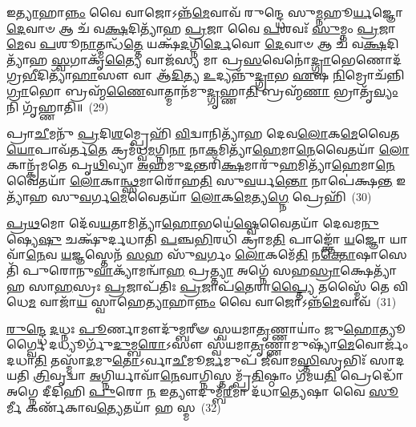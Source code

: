 𑌇\-\ul{𑌤𑍍𑌯𑌾}\-𑌹𑌾\-\ul{𑌨𑍍𑌨𑌂} 𑌵𑍈 𑌵𑌾𑌜𑍋\-𑌽𑌨𑍍𑌨᳴\-\ul{𑌮𑍇}\-𑌵𑌾𑌵᳴ 𑌰𑍁𑌨𑍍𑌦𑍍𑌧𑍇 𑌸𑍁\-\ul{𑌮𑍍𑌨}\-𑌹𑍂\-\ul{𑌰𑍍𑌯}\-𑌜𑍍𑌞𑍋 \ul{𑌦𑍇}\-𑌵𑌾𑍞 𑌆 𑌚᳴ 𑌵\-\ul{𑌕𑍍𑌷}\-𑌦𑌿𑌤𑍍𑌯𑌾᳴𑌹 \ul{𑌪𑍍𑌰}\-𑌜𑌾 𑌵𑍈 \ul{𑌪}\-𑌶𑌵𑌃᳴ \ul{𑌸𑍁}\-𑌮𑍍𑌨𑌂 \ul{𑌪𑍍𑌰}\-𑌜𑌾\-\ul{𑌮𑍇}\-𑌵 \ul{𑌪}\-𑌶𑍂\-\ul{𑌨𑌾}\-𑌤𑍍𑌮𑌨𑍍𑌧᳴\-\ul{𑌤𑍍𑌤𑍇} 𑌯𑌕𑍍𑌷᳴\-\ul{𑌦}\-𑌗𑍍𑌨𑌿\-\ul{𑌰𑍍𑌦𑍇}\-𑌵𑍋 \ul{𑌦𑍇}\-𑌵𑌾𑍞 𑌆 𑌚᳴ 𑌵\-\ul{𑌕𑍍𑌷}\-𑌦𑌿𑌤𑍍𑌯𑌾᳴𑌹 \ul{𑌸𑍍𑌵}\-𑌗𑌾𑌕𑍃᳴\-\ul{𑌤𑍍𑌯𑍈} 𑌵𑌾𑌜᳴𑌸𑍍𑌯 𑌮𑌾 𑌪𑍍𑌰\-\ul{𑌸}\-𑌵𑍇𑌨𑍋॑\-\ul{𑌦𑍍𑌗𑍍𑌰𑌾}\-𑌭𑍇𑌣𑍋𑌦᳴𑌗𑍍𑌰\-\ul{𑌭𑍀}\-𑌦𑌿𑌤𑍍𑌯𑌾᳴\-\ul{𑌹𑌾}\-𑌸𑍗 𑌵𑌾 𑌆᳴\-\ul{𑌦𑌿}\-𑌤𑍍𑌯 \ul{𑌉}\-𑌦𑍍𑌯𑌨𑍍𑌨𑍁᳴\-\ul{𑌦𑍍𑌗𑍍𑌰𑌾}\-𑌭 \ul{𑌏}\-𑌷 \ul{𑌨𑌿}\-𑌮𑍍𑌰𑍋𑌚᳴𑌨𑍍𑌨𑌿\-\ul{𑌗𑍍𑌰𑌾}\-𑌭𑍋 𑌬𑍍𑌰𑌹𑍍𑌮᳴\-\ul{𑌣𑍈}\-𑌵𑌾𑌤𑍍𑌮𑌾𑌨᳴𑌮𑍁\-\ul{𑌦𑍍𑌗𑍃}\-𑌹𑍍𑌣𑌾\-\ul{𑌤𑌿} 𑌬𑍍𑌰𑌹𑍍𑌮᳴\-\ul{𑌣𑌾} 𑌭𑍍𑌰𑌾𑌤𑍃᳴\-\ul{𑌵𑍍𑌯𑌂} 𑌨𑌿 𑌗𑍃᳴𑌹𑍍𑌣𑌾𑌤𑌿॥~(29)

{\anuvakamend[{\-\ul{𑌪𑍍𑌰𑌾}\-𑌣𑍈𑌃 𑌪𑍋𑌷𑍋॑\-𑌽\-\ul{𑌪𑍍𑌰}\-𑌤𑍍𑌯𑌾𑌗𑍍𑌨𑍀॑\-\ul{𑌧𑍍𑌰𑍇} 𑌪𑌤𑌿᳴\-\ul{𑌮𑍇}\-𑌷 𑌦𑌶᳴ 𑌚}]}%

𑌪𑍍𑌰𑌾\-\ul{𑌚𑍀}\-𑌮𑌨𑍁᳴ \ul{𑌪𑍍𑌰}\-𑌦𑌿\-\ul{𑌶}\-𑌮𑍍𑌪𑍍𑌰𑍇𑌹𑌿᳴ \ul{𑌵𑌿}\-𑌦𑍍𑌵𑌾𑌨𑌿𑌤𑍍𑌯𑌾᳴𑌹 𑌦𑍇𑌵\-\ul{𑌲𑍋}\-𑌕\-\ul{𑌮𑍇}\-𑌵𑍈𑌤\-\ul{𑌯𑍋}\-𑌪𑌾𑌵᳴𑌰𑍍𑌤\-\ul{𑌤𑍇} 𑌕𑍍𑌰𑌮᳴𑌧𑍍𑌵\-\ul{𑌮}\-𑌗𑍍𑌨𑌿\-\ul{𑌨𑌾} 𑌨𑌾\-\ul{𑌕}\-𑌮𑌿𑌤𑍍𑌯𑌾᳴\-\ul{𑌹𑍇}\-𑌮𑌾\-\ul{𑌨𑍇}\-𑌵𑍈𑌤𑌯𑌾᳴ \ul{𑌲𑍋}\-𑌕𑌾𑌨𑍍𑌕𑍍𑌰᳴𑌮𑌤𑍇 𑌪𑍃\-\ul{𑌥𑌿}\-𑌵𑍍𑌯𑌾 \ul{𑌅}\-𑌹𑌮𑍁\-\ul{𑌦}\-𑌨𑍍𑌤𑌰𑌿᳴\-\ul{𑌕𑍍𑌷}\-𑌮𑌾𑌰𑍁᳴\-\ul{𑌹}\-𑌮𑌿𑌤𑍍𑌯𑌾᳴\-\ul{𑌹𑍇}\-𑌮𑌾\-\ul{𑌨𑍇}\-𑌵𑍈𑌤𑌯𑌾᳴ \ul{𑌲𑍋}\-𑌕𑌾\-\ul{𑌨𑍍𑌥𑍍𑌸}\-𑌮𑌾𑌰𑍋᳴𑌹\-\ul{𑌤𑌿} 𑌸𑍁\-\ul{𑌵}\-𑌰𑍍𑌯\-\ul{𑌨𑍍𑌤𑍋} 𑌨𑌾𑌪𑍇॑𑌕𑍍𑌷\-\ul{𑌨𑍍𑌤} 𑌇𑌤𑍍𑌯𑌾᳴𑌹 𑌸𑍁\-\ul{𑌵}\-𑌰𑍍𑌗\-\ul{𑌮𑍇}\-𑌵𑍈𑌤𑌯𑌾᳴ \ul{𑌲𑍋}\-𑌕\-\ul{𑌮𑍇}\-𑌤𑍍𑌯\-\ul{𑌗𑍍𑌨𑍇} 𑌪𑍍𑌰𑍇𑌹𑌿᳴~(30)

\-\ul{𑌪𑍍𑌰}\-\-\ul{𑌥}\-𑌮𑍋 𑌦𑍇᳴𑌵\-\ul{𑌯}\-𑌤𑌾𑌮𑌿𑌤𑍍𑌯𑌾᳴\-\ul{𑌹𑍋}\-𑌭𑌯𑍇॑\-\ul{𑌷𑍍𑌵𑍇}\-𑌵𑍈𑌤𑌯𑌾᳴ 𑌦𑍇𑌵𑌮\-\ul{𑌨𑍁}\-𑌷𑍍𑌯𑍇\-\ul{𑌷𑍁} 𑌚𑌕𑍍𑌷𑍁᳴𑌰𑍍𑌦𑌧𑌾𑌤𑌿 \ul{𑌪}\-𑌞𑍍𑌚\-\ul{𑌭𑌿}\-𑌰𑌧𑌿᳴ 𑌕𑍍𑌰𑌾𑌮\-\ul{𑌤𑌿} 𑌪𑌾𑌙𑍍𑌕𑍍𑌤𑍋᳴ \ul{𑌯}\-𑌜𑍍𑌞𑍋 𑌯𑌾𑌵𑌾᳴\-\ul{𑌨𑍇}\-𑌵 \ul{𑌯}\-𑌜𑍍𑌞𑌸𑍍𑌤𑍇𑌨᳴ \ul{𑌸}\-𑌹 𑌸𑍁᳴\-\ul{𑌵}\-𑌰𑍍𑌗𑌂 \ul{𑌲𑍋}\-𑌕𑌮𑍇᳴\-\ul{𑌤𑌿} 𑌨\-\ul{𑌕𑍍𑌤𑍋}\-𑌷𑌾𑌸𑍇𑌤𑌿᳴ 𑌪𑍁𑌰𑍋𑌨𑍁\-\ul{𑌵𑌾}\-𑌕𑍍𑌯𑌾᳴𑌮𑌨𑍍𑌵𑌾᳴\-\ul{𑌹} 𑌪𑍍𑌰\-\ul{𑌤𑍍𑌤𑍍𑌯𑌾} 𑌅𑌗𑍍𑌨𑍇᳴ 𑌸𑌹\-\ul{𑌸𑍍𑌰𑌾}\-𑌕𑍍𑌷𑍇𑌤𑍍𑌯𑌾᳴𑌹 𑌸𑌾\-\ul{𑌹}\-𑌸𑍍𑌰𑌃 \ul{𑌪𑍍𑌰}\-𑌜𑌾𑌪᳴𑌤𑌿𑌃 \ul{𑌪𑍍𑌰}\-𑌜𑌾𑌪᳴\-\ul{𑌤𑍇}\-𑌰𑌾\-\ul{𑌪𑍍𑌤𑍍𑌯𑍈} 𑌤𑌸𑍍𑌮𑍈᳴ 𑌤𑍇 𑌵𑌿𑌧𑍇\-\ul{𑌮} 𑌵𑌾𑌜𑌾᳴\-\ul{𑌯} 𑌸𑍍𑌵𑌾𑌹𑍇\-\ul{𑌤𑍍𑌯𑌾}\-𑌹𑌾\-\ul{𑌨𑍍𑌨𑌂} 𑌵𑍈 𑌵𑌾𑌜𑍋\-𑌽𑌨𑍍𑌨᳴\-\ul{𑌮𑍇}\-𑌵𑌾𑌵᳴~(31)

\-\ul{𑌰𑍁}\-\-\ul{𑌨𑍍𑌦𑍍𑌧𑍇} \ul{𑌦}\-𑌧𑍍𑌨𑌃 \ul{𑌪𑍂}\-𑌰𑍍𑌣𑌾𑌮𑍗𑌦𑍁᳴𑌮𑍍𑌬𑌰𑍀𑍟 𑌸𑍍𑌵𑌯𑌮𑌾\-\ul{𑌤𑍃}\-𑌣𑍍𑌣𑌾𑌯𑌾𑌂॑ 𑌜𑍁\-\ul{𑌹𑍋}\-𑌤𑍍𑌯𑍂𑌰𑍍𑌗𑍍𑌵𑍈 𑌦𑌧𑍍𑌯𑍂𑌰𑍍𑌗𑍁᳴\-\ul{𑌦𑍁}\-𑌮𑍍𑌬\-\ul{𑌰𑍋}\-\-𑌽𑌸𑍗 𑌸𑍍𑌵᳴𑌯𑌮𑌾\-\ul{𑌤𑍃}\-𑌣𑍍𑌣𑌾𑌮𑍁𑌷𑍍𑌯𑌾᳴\-\ul{𑌮𑍇}\-𑌵𑍋𑌰𑍍𑌜𑌂᳴ 𑌦𑌧𑌾\-\ul{𑌤𑌿} 𑌤𑌸𑍍𑌮𑌾᳴\-\ul{𑌦}\-𑌮𑍁\-\ul{𑌤𑍋}\-\-𑌽𑌰𑍍𑌵𑌾\-\ul{𑌚𑍀}\-𑌮𑍂\-\ul{𑌰𑍍𑌜}\-𑌮𑍁𑌪᳴ 𑌜𑍀𑌵𑌾𑌮\-\ul{𑌸𑍍𑌤𑌿}\-𑌸𑍃𑌭𑌿𑌃᳴ 𑌸𑌾𑌦𑌯𑌤𑌿 \ul{𑌤𑍍𑌰𑌿}\-𑌵𑍃𑌦𑍍𑌵𑌾 \ul{𑌅}\-𑌗𑍍𑌨𑌿𑌰𑍍𑌯𑌾𑌵𑌾᳴\-\ul{𑌨𑍇}\-𑌵𑌾𑌗𑍍𑌨𑌿𑌸𑍍𑌤𑌮𑍍𑌪𑍍𑌰᳴\-\ul{𑌤𑌿}\-𑌷𑍍𑌠𑌾𑌂 𑌗᳴𑌮𑌯\-\ul{𑌤𑌿} 𑌪𑍍𑌰𑍇𑌦𑍍𑌧𑍋᳴ 𑌅𑌗𑍍𑌨𑍇 𑌦𑍀𑌦𑌿𑌹𑌿 \ul{𑌪𑍁}\-𑌰𑍋 \ul{𑌨} 𑌇𑌤𑍍𑌯𑍗𑌦𑍁𑌮𑍍𑌬᳴\-\ul{𑌰𑍀}\-𑌮𑌾 𑌦᳴𑌧𑌾\-\ul{𑌤𑍍𑌯𑍇}\-𑌷𑌾 𑌵𑍈 \ul{𑌸𑍂}\-𑌰𑍍𑌮𑍀 𑌕𑌰𑍍𑌣᳴𑌕𑌾𑌵\-\ul{𑌤𑍍𑌯𑍇}\-𑌤𑌯𑌾᳴ 𑌹 𑌸𑍍𑌮~(32)

